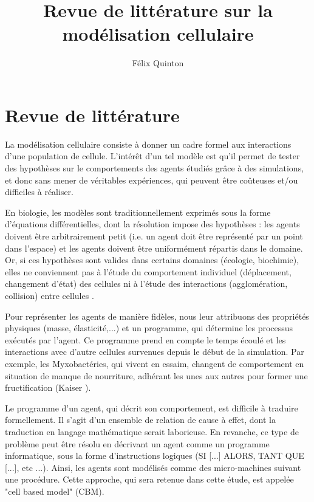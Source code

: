 \documentclass[11pt,a4paper]{article}
\title{Revue de littérature sur la modélisation cellulaire}
\author{Félix Quinton}
\begin{document}
\maketitle
\thispagestyle{empty}

\section{Revue de littérature}

La modélisation cellulaire consiste à donner un cadre formel aux interactions d'une population de cellule. L'intérêt d'un tel modèle est qu'il permet de tester des hypothèses sur le comportements des agents étudiés grâce à des simulations, et donc sans mener de véritables expériences, qui peuvent être coûteuses et/ou difficiles à réaliser. 

En biologie, les modèles sont traditionnellement exprimés sous la forme d'équations différentielles, dont la résolution impose des hypothèses : les agents doivent être arbitrairement petit (i.e. un agent doit être représenté par un point dans l'espace) et les agents doivent être uniformément répartis dans le domaine. Or, si ces hypothèses sont valides dans certains domaines (écologie, biochimie), elles ne conviennent pas à l'étude du comportement individuel (déplacement, changement d'état) des cellules ni à l'étude des interactions (agglomération, collision) entre cellules \cite{tamulonis2013cell}.

Pour représenter les agents de manière fidèles, nous leur attribuons des propriétés physiques (masse, élasticité,...) et un programme, qui détermine les processus exécutés par l'agent. Ce programme prend en compte le temps écoulé et les interactions avec d'autre cellules survenues depuis le début de la simulation. Par exemple, les Myxobactéries, qui vivent en essaim, changent de comportement en situation de manque de nourriture, adhérant les unes aux autres pour former une fructification (Kaiser \cite{kaiser2003coupling}).

Le programme d'un agent, qui décrit son comportement, est difficile à traduire formellement. Il s'agit d'un ensemble de relation de cause à effet, dont la traduction en langage mathématique serait laborieuse. En revanche, ce type de problème peut être résolu en décrivant un agent comme un programme informatique, sous la forme d'instructions logiques (SI [...] ALORS, TANT QUE [...], etc ...). Ainsi, les agents sont modélisés comme des micro-machines suivant une procédure. Cette approche, qui sera retenue dans cette étude, est appelée "cell based model" (CBM).
\end{document}
